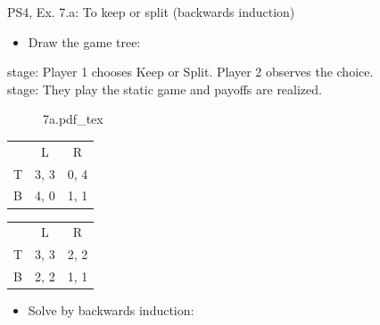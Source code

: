 \begin{frame}{PS4, Ex. 7.a: To keep or split (backwards induction)}
  \begin{multicols}{2}
    \begin{itemize}
      \item[(a)] Draw the game tree:
    \end{itemize}
     stage: Player 1 chooses Keep or Split. Player 2 observes the choice.\\\medskip
     stage: They play the static game and payoffs are realized.
    \begin{figure}[!h]
      \begin{center}
      \def\svgwidth{.5\columnwidth}
      {7a.pdf_tex}
      \end{center}
    \end{figure}
    \vspace{-12pt}
    \begin{table}
      \begin{tabular}{l|c|c|}
        \multicolumn{1}{c}{} & \multicolumn{1}{c}{L} & \multicolumn{1}{c}{R} \\\cline{2-3}
        T & 3, 3 & 0, 4 \\\cline{2-3}
        B & 4, 0 & 1, 1 \\\cline{2-3}
      \end{tabular}
      \enskip
      \begin{tabular}{l|c|c|}
        \multicolumn{1}{c}{} & \multicolumn{1}{c}{L} & \multicolumn{1}{c}{R} \\\cline{2-3}
        T & 3, 3 & 2, 2 \\\cline{2-3}
        B & 2, 2 & 1, 1 \\\cline{2-3}
      \end{tabular}
    \end{table}
  \vfill\null \columnbreak
    \begin{itemize}
    \item[(b)] Solve by backwards induction:
    \end{itemize}
  \vfill\null
  \end{multicols}
\end{frame}

